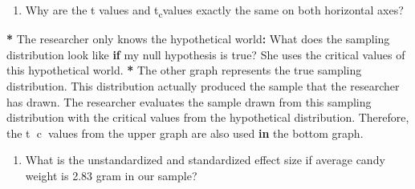 \documentclass[a4paper]{book}
\newenvironment{Shaded}{\begin{snugshade}}{\end{snugshade}}
\newcommand{\StringTok}[1]{\textcolor[rgb]{0.00,0.00,0.00}{#1}}
\newcommand{\ControlFlowTok}[1]{\textcolor[rgb]{0.00,0.00,0.00}{\textbf{#1}}}
\newcommand{\OperatorTok}[1]{\textcolor[rgb]{0.00,0.00,0.00}{\textbf{#1}}}
\newcommand{\NormalTok}[1]{#1}
\providecommand{\tightlist}{%
  \setlength{\itemsep}{0pt}\setlength{\parskip}{0pt}}
\theoremstyle{definition}
\theoremstyle{definition}
\theoremstyle{definition}
\theoremstyle{remark}
\begin{document}
\begin{enumerate}
\def\labelenumi{\arabic{enumi}.}
\setcounter{enumi}{2}
\tightlist
\item
  Why are the t values and t\textsubscript{c}values exactly the same on
  both horizontal axes?
\end{enumerate}

\begin{Shaded}
\begin{Highlighting}[]
\OperatorTok{*}\StringTok{ }\NormalTok{The researcher only knows the hypothetical world}\OperatorTok{:}\StringTok{ }\NormalTok{What does the sampling}
\NormalTok{distribution look like }\ControlFlowTok{if}\NormalTok{ my null hypothesis is true? She uses the critical}
\NormalTok{values of this hypothetical world.}
\OperatorTok{*}\StringTok{ }\NormalTok{The other graph represents the true sampling distribution. This distribution}
\NormalTok{actually produced the sample that the researcher has drawn. The researcher}
\NormalTok{evaluates the sample drawn from this sampling distribution with the critical}
\NormalTok{values from the hypothetical distribution. Therefore, the t}\OperatorTok{~}\NormalTok{c}\OperatorTok{~}\NormalTok{values from the}
\NormalTok{upper graph are also used }\ControlFlowTok{in}\NormalTok{ the bottom graph.}
\end{Highlighting}
\end{Shaded}

\begin{enumerate}
\def\labelenumi{\arabic{enumi}.}
\setcounter{enumi}{3}
\tightlist
\item
  What is the unstandardized and standardized effect size if average
  candy weight is 2.83 gram in our sample?
\end{enumerate}
\end{document}
